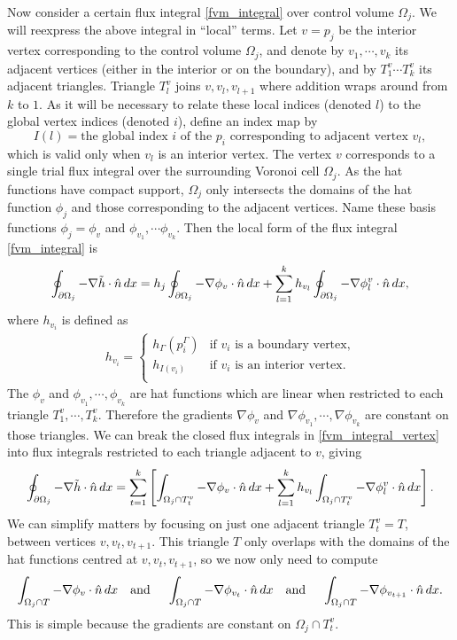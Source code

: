 Now consider a certain flux integral \eqref{fvm_integral} over control volume $\Omega_j$. We will reexpress the above integral
in ``local'' terms.
Let $v = p_j$ be the interior vertex corresponding to the control volume $\Omega_j$, and denote by $v_1, \cdots, v_k$ its adjacent vertices (either in the interior
or on the boundary), and by $T^v_1 \cdots T^v_k$ its adjacent triangles. Triangle $T^v_l$ joins $v,v_l,v_{l+1}$ where addition wraps around from $k$ to $1$.
As it will be necessary to relate these local indices (denoted $l$) to the global vertex indices (denoted $i$), define an index map by
    $$I(l) = \text{the global index $i$ of the $p_i$ corresponding to adjacent vertex $v_l$},$$
which is valid only when $v_l$ is an interior vertex.
The vertex $v$ corresponds to a single trial flux integral over the surrounding Voronoi cell $\Omega_j$.
As the hat functions have compact support, $\Omega_j$ only intersects the domains of the hat function $\phi_j$ and those corresponding
to the adjacent vertices. Name these basis functions $\phi_j = \phi_v$ and $\phi_{v_1}, \cdots \phi_{v_k}$.
Then the local form of the flux integral \eqref{fvm_integral} is
\begin{equation}\label{fvm_integral_vertex}
    \oint_{{\partial\Omega}_j} -\nabla \tilde{h}\cdot\hat{n}\,dx = h_j\oint_{{\partial\Omega}_j}-\nabla\phi_v\cdot\hat{n}\,dx + \sum_{l=1}^{k}h_{v_l}\oint_{{\partial\Omega}_j}-\nabla\phi^v_l\cdot\hat{n}\,dx,
\end{equation}
where $h_{v_i}$ is defined as
\begin{align*}
    h_{v_i} =
    \left\{\begin{array}{lr}
        h_\Gamma(p^\Gamma_i) &\text{if $v_i$ is a boundary vertex,}\\
        h_{I(v_i)} &\text{if $v_i$ is an interior vertex}.\\
        \end{array}\right.
\end{align*}
The $\phi_v$ and $\phi_{v_1},\cdots,\phi_{v_k}$ are hat functions which are linear when restricted to each triangle
$T^v_1,\cdots,T^v_k$. Therefore the gradients $\nabla\phi_v$ and $\nabla\phi_{v_1},\cdots,\nabla\phi_{v_k}$ are constant
on those triangles. We can break the closed flux integrals in \eqref{fvm_integral_vertex} into flux integrals restricted to each triangle adjacent to $v$, giving
\begin{equation}\label{fvm_integral_vertex_triangles}
    \oint_{{\partial\Omega}_j} -\nabla \tilde{h}\cdot\hat{n}\,dx = \sum_{t=1}^k\left[\int_{\Omega_j \cap T^v_t}-\nabla\phi_v\cdot\hat{n}\,dx + \sum_{l=1}^{k}h_{v_l}\int_{\Omega_j \cap T^v_t}-\nabla\phi^v_l\cdot\hat{n}\,dx\right].
\end{equation}
We can simplify matters by focusing on just one adjacent triangle $T^v_t = T$, between vertices
$v,v_t,v_{t+1}$. This triangle $T$ only overlaps with the domains of the hat functions centred at $v,v_t,v_{t+1}$, so we
now only need to compute
$$
\int_{\Omega_j \cap T} -\nabla\phi_v\cdot\hat{n}\,dx \text{\quad and \quad} 
\int_{\Omega_j \cap T} -\nabla\phi_{v_t}\cdot\hat{n}\,dx \text{\quad and \quad} 
\int_{\Omega_j \cap T} -\nabla\phi_{v_{t+1}}\cdot\hat{n}\,dx.
$$
This is simple because the gradients are constant on $\Omega_j \cap T_t^v$.

